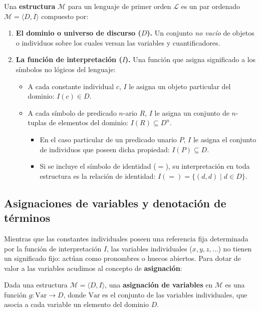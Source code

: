 \begin{definition}
Una \textbf{estructura} $\mathcal{M}$ para un lenguaje de primer orden $\mathcal{L}$ es un par ordenado $\mathcal{M} = \langle D, I \rangle$ compuesto por:
\begin{enumerate}
    \item \textbf{El dominio o universo de discurso ($D$).} Un conjunto \emph{no vacío} de objetos o individuos sobre los cuales versan las variables y cuantificadores.
    \item \textbf{La función de interpretación ($I$).} Una función que asigna significado a los símbolos no lógicos del lenguaje:
    \begin{itemize}
        \item A cada constante individual $c$, $I$ le asigna un objeto particular del dominio: $I(c) \in D$.
        \item A cada símbolo de predicado $n$-ario $R$, $I$
          le asigna un conjunto de $n$-tuplas de elementos del
          dominio: $I(R) \subseteq D^n$.
       \begin{itemize}
        \item En el caso particular de un predicado
            unario $P$, $I$ le asigna el conjunto de individuos
          que poseen dicha propiedad: $I(P) \subseteq D$.
        \item Si se incluye el símbolo de identidad ($=$), su
          interpretación en toda estructura es la relación de identidad: $I(=) = \{(d, d) \mid d \in D\}$. 
       \end{itemize}
    \end{itemize}
\end{enumerate}
\end{definition}

\subsection{Asignaciones de variables y denotación de términos}

Mientras que las constantes individuales poseen una referencia fija
determinada por la función de interpretación $I$, las variables
individuales ($x, y, z, \dots$) no tienen un significado fijo: actúan
como pronombres o huecos abiertos. Para dotar de valor a las variables
acudimos al concepto de \textbf{asignación}:

\begin{definition}
Dada una estructura $\mathcal{M} = \langle D, I \rangle$, una \textbf{asignación de variables} en $\mathcal{M}$ es una función $g: \text{Var} \to D$, donde $\text{Var}$ es el conjunto de las variables individuales, que asocia a cada variable un elemento del dominio $D$.
\end{definition}

